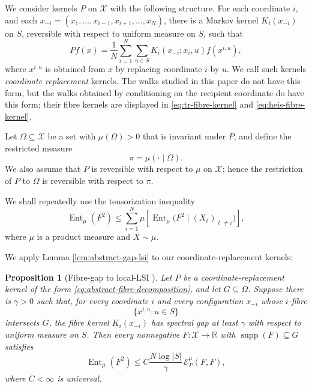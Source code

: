 \documentclass[11pt, reqno]{amsart}
\numberwithin{equation}{section}
\newtheorem{proposition}[theorem]{Proposition}
\newcommand{\Ent}{\operatorname{Ent}}
\newcommand{\cE}{\mathcal E}
\newcommand{\supp}{\operatorname{supp}}
\begin{document}
We consider kernels \(P\) on \(\mathcal X\) with the following structure.  For
each coordinate \(i\), and each
\(x_{-i}=(x_1,\ldots,x_{i-1},x_{i+1},\ldots,x_N)\), there is a Markov kernel
\(K_i(x_{-i})\) on \(S\), reversible with respect to uniform measure on \(S\),
such that
\begin{equation}\label{eq:abstract-fibre-decomposition}
    Pf(x)=\frac1N\sum_{i=1}^N
    \sum_{u\in S}K_i(x_{-i};x_i,u)f(x^{i,u}),
\end{equation}
where \(x^{i,u}\) is obtained from \(x\) by replacing coordinate \(i\) by
\(u\).  We call such kernels \textit{coordinate replacement} kernels. The walks studied in this paper do not have this form, but the walks obtained by conditioning on the recipient coordinate do have this form; their fibre kernels are displayed in \eqref{eq:tr-fibre-kernel} and \eqref{eq:heis-fibre-kernel}.

Let \(\Omega\subseteq\mathcal X\) be a set with $\mu(\Omega) > 0$ that is invariant under $P$, and define the restricted measure
\[
\pi=\mu(\cdot\mid\Omega).
\]
We also assume that \(P\)  is reversible with respect to \(\mu\) on \(\mathcal X\); hence the restriction of $P$ to \(\Omega\) is reversible with respect to \(\pi\). 

We shall repeatedly use the tensorization inequality
\begin{equation}\label{eq:abstract-tensorization}
    \Ent_\mu(F^2)
    \le
    \sum_{i=1}^N
    \mu\left[\Ent_\mu\bigl(F^2\mid (X_\ell)_{\ell\ne i}\bigr)\right],
\end{equation}
where $\mu$ is a product measure and $X \sim \mu$.

We apply Lemma \ref{lem:abstract-gap-lsi} to our coordinate-replacement kernels:

\begin{proposition}[Fibre-gap to local-LSI ]\label{prop:abstract-fibre-gap-lsi}
Let \(P\) be a coordinate-replacement kernel of the form
\eqref{eq:abstract-fibre-decomposition}, and let \(G\subseteq\Omega\).  Suppose
there is \(\gamma>0\) such that, for every coordinate \(i\) and every
configuration \(x_{-i}\) whose \(i\)-fibre
\[
    \{x^{i,u}:u\in S\}
\]
intersects \(G\), the fibre kernel \(K_i(x_{-i})\) has spectral gap at least
\(\gamma\) with respect to uniform measure on \(S\).  Then every nonnegative
\(F:\mathcal X\to\mathbb R\) with \(\supp(F)\subseteq G\) satisfies
\begin{equation}\label{eq:abstract-local-lsi}
    \Ent_\mu(F^2)
    \le
    C\frac{N\log |S|}{\gamma}\,\cE_P^\mu(F,F),
\end{equation}
where \(C<\infty\) is universal.
\end{proposition}
\end{document}
